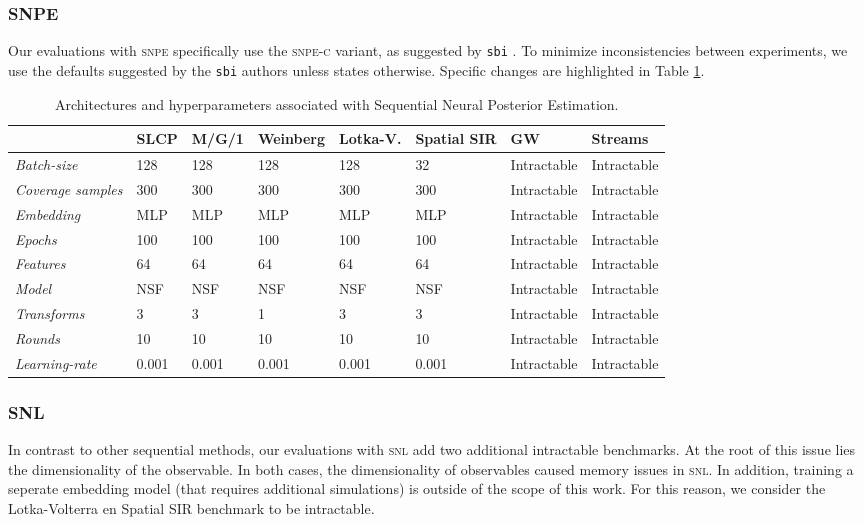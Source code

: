 \documentclass[twoside]{article}
\begin{document}
\subsubsection{SNPE}
Our evaluations with \textsc{snpe} specifically use the \textsc{snpe-c} \citep{greenberg2019automatic} variant, as suggested by \texttt{sbi} \citep{sbi}.
To minimize inconsistencies between experiments, we use the defaults suggested by the \texttt{sbi} authors unless states otherwise. Specific changes are highlighted in Table \ref{tab:snpe_hyperparameters}.

\begin{table}[h!]
    \centering
    \begin{tabular}{llllllll}
        \toprule
        & SLCP & M/G/1 & Weinberg & Lotka-V. & Spatial SIR & GW & Streams \\
        \midrule
        \emph{Batch-size} & 128 & 128 & 128 & 128 & 32 & Intractable & Intractable \\
        \emph{Coverage samples} & 300 & 300 & 300 & 300 & 300 & Intractable & Intractable \\
        \emph{Embedding} & MLP & MLP & MLP & MLP & MLP & Intractable & Intractable \\
        \emph{Epochs} & 100 & 100 & 100 & 100 & 100 & Intractable & Intractable \\
        \emph{Features} & 64 & 64 & 64 & 64 & 64 & Intractable & Intractable \\
        \emph{Model} & NSF & NSF & NSF & NSF & NSF & Intractable & Intractable \\
        \emph{Transforms} & 3 & 3 & 1 & 3 & 3 & Intractable & Intractable \\
        \emph{Rounds} & 10 & 10 & 10 & 10 & 10 & Intractable & Intractable \\
        \emph{Learning-rate} & 0.001 & 0.001 & 0.001 & 0.001 & 0.001 & Intractable & Intractable \\
        \bottomrule
    \end{tabular}
    \caption{Architectures and hyperparameters associated with Sequential Neural Posterior Estimation.}
    \label{tab:snpe_hyperparameters}
\end{table}

\subsubsection{SNL}
In contrast to other sequential methods, our evaluations with \textsc{snl} \citep{papamakarios2019sequential} add two additional intractable benchmarks. At the root of this issue lies the dimensionality of the observable. In both cases, the dimensionality of observables caused memory issues in \textsc{snl}. In addition, training a seperate embedding model (that requires additional simulations) is outside of the scope of this work. For this reason, we consider the Lotka-Volterra en Spatial SIR benchmark to be intractable.
\end{document}
